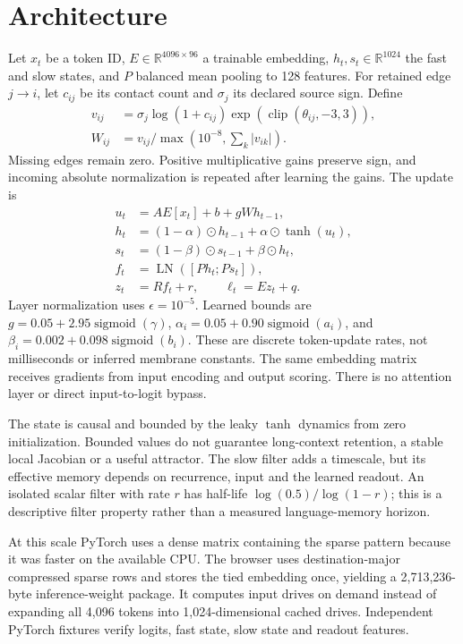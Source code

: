 \documentclass[10pt]{article}
\begin{document}
\section{Architecture}
Let $x_t$ be a token ID, $E\in\mathbb{R}^{4096\times96}$ a trainable embedding, $h_t,s_t\in\mathbb{R}^{1024}$ the fast and slow states, and $P$ balanced mean pooling to 128 features. For retained edge $j\rightarrow i$, let $c_{ij}$ be its contact count and $\sigma_j$ its declared source sign. Define
\begin{align}
v_{ij}&=\sigma_j\log(1+c_{ij})\exp(\operatorname{clip}(\theta_{ij},-3,3)),\\
W_{ij}&=v_{ij}/\max\!\left(10^{-8},\sum_k|v_{ik}|\right).
\end{align}
Missing edges remain zero. Positive multiplicative gains preserve sign, and incoming absolute normalization is repeated after learning the gains. The update is
\begin{align}
u_t &= A E[x_t]+b+gWh_{t-1},\\
h_t &= (1-\alpha)\odot h_{t-1}+\alpha\odot\tanh(u_t),\\
s_t &= (1-\beta)\odot s_{t-1}+\beta\odot h_t,\\
f_t &= \operatorname{LN}([Ph_t;Ps_t]),\\
z_t &= Rf_t+r,\qquad \ell_t=Ez_t+q.
\end{align}
Layer normalization uses $\epsilon=10^{-5}$. Learned bounds are $g=0.05+2.95\operatorname{sigmoid}(\gamma)$, $\alpha_i=0.05+0.90\operatorname{sigmoid}(a_i)$, and $\beta_i=0.002+0.098\operatorname{sigmoid}(b_i)$. These are discrete token-update rates, not milliseconds or inferred membrane constants. The same embedding matrix receives gradients from input encoding and output scoring. There is no attention layer or direct input-to-logit bypass.

The state is causal and bounded by the leaky $\tanh$ dynamics from zero initialization. Bounded values do not guarantee long-context retention, a stable local Jacobian or a useful attractor. The slow filter adds a timescale, but its effective memory depends on recurrence, input and the learned readout. An isolated scalar filter with rate $r$ has half-life $\log(0.5)/\log(1-r)$; this is a descriptive filter property rather than a measured language-memory horizon.

At this scale PyTorch uses a dense matrix containing the sparse pattern because it was faster on the available CPU. The browser uses destination-major compressed sparse rows and stores the tied embedding once, yielding a 2,713,236-byte inference-weight package. It computes input drives on demand instead of expanding all 4,096 tokens into 1,024-dimensional cached drives. Independent PyTorch fixtures verify logits, fast state, slow state and readout features.
\end{document}
